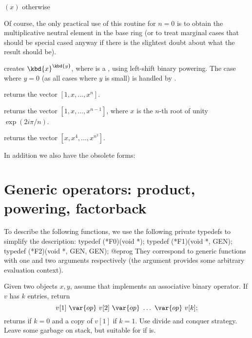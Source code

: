 \item {}$(x)$ otherwise

Of course, the only practical use of this routine for $n = 0$ is
to obtain the multiplicative neutral element in the base ring (or to treat
marginal cases that should be special cased anyway if there is the slightest
doubt about what the result should be).

 creates $\kbd{x}^{\kbd{y}}$, where  is a
, using left-shift binary powering. The case where $y = 0$
(as all cases where $y$ is small) is handled by .

 returns the vector $[1,x,\dots,x^n]$.

 returns the vector
$[1,x,\dots,x^{n-1}]$, where $x$ is the $n$-th root of unity $\exp(2i\pi/n)$.

 returns the vector $[x,x^4,\dots,x^{n^2}]$.

In addition we also have the obsolete forms:





\section{Generic operators: product, powering, factorback}

To describe the following functions, we use the following private typedefs
to simplify the description:
\bprog
  typedef (*F0)(void *);
  typedef (*F1)(void *, GEN);
  typedef (*F2)(void *, GEN, GEN);
@eprog
\noindent They correspond to generic functions with one and two arguments
respectively (the  argument provides some arbitrary evaluation
context).

Given two objects $x,y$, assume that  implements an
associative binary operator. If $v$ has $k$ entries, return
$$v[1]~\var{op}~v[2]~\var{op}~\ldots ~\var{op}~v[k];$$
returns  if $k = 0$ and a copy of $v[1]$ if $k = 1$.
Use divide and conquer strategy. Leave some garbage on stack, but suitable for
 if  is.

